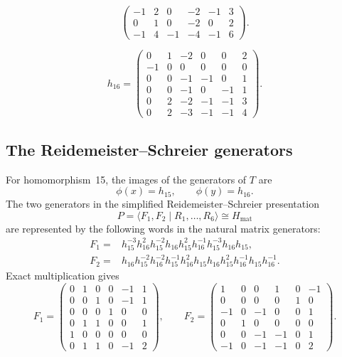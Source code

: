 \begin{description}
\[\begin{pmatrix}
-1 & 2 & 0 & -2 & -1 & 3 \\
0 & 1 & 0 & -2 & 0 & 2 \\
-1 & 4 & -1 & -4 & -1 & 6
\end{pmatrix}.
\]
\item[$h_{16}$] 
\[
h_{16}=\begin{pmatrix}
0 & 1 & -2 & 0 & 0 & 2 \\
-1 & 0 & 0 & 0 & 0 & 0 \\
0 & 0 & -1 & -1 & 0 & 1 \\
0 & 0 & -1 & 0 & -1 & 1 \\
0 & 2 & -2 & -1 & -1 & 3 \\
0 & 2 & -3 & -1 & -1 & 4
\end{pmatrix}.
\]
\end{description}

\subsection{The Reidemeister--Schreier generators}

For homomorphism~15, the images of the generators of $T$ are
\[
\phi(x)=h_{15},\qquad \phi(y)=h_{16}.
\]
The two generators in the simplified Reidemeister--Schreier presentation
\[
P=\langle F_1,F_2\mid R_1,\ldots,R_6\rangle
\cong H_{\mathrm{mat}}
\]
are represented by the following words in the natural matrix generators:
\begin{align*}
F_1={}&
h_{15}^{-3}h_{16}^2h_{15}^{-2}h_{16}h_{15}^2
h_{16}^{-1}h_{15}^{-3}h_{16}h_{15},\\
F_2={}&
h_{16}h_{15}^{-2}h_{16}^{-2}h_{15}^{-1}h_{16}^2
h_{15}h_{16}h_{15}^2h_{16}^{-1}h_{15}h_{16}^{-1}.
\end{align*}
Exact multiplication gives
\[
F_1=
\begin{pmatrix}
0&1&0&0&-1&1\\
0&0&1&0&-1&1\\
0&0&0&1&0&0\\
0&1&1&0&0&1\\
1&0&0&0&0&0\\
0&1&1&0&-1&2
\end{pmatrix},
\qquad
F_2=
\begin{pmatrix}
1&0&0&1&0&-1\\
0&0&0&0&1&0\\
-1&0&-1&0&0&1\\
0&1&0&0&0&0\\
0&0&-1&-1&0&1\\
-1&0&-1&-1&0&2
\end{pmatrix}.
\]

